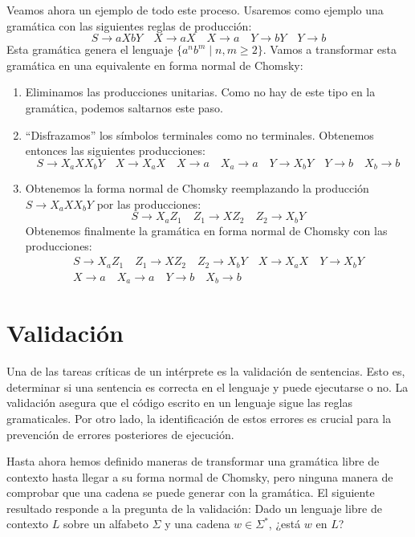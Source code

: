 Veamos ahora un ejemplo de todo este proceso. Usaremos como ejemplo una gramática con las siguientes reglas de
producción:
\begin{equation}
    S\to aXbY\quad X\to aX\quad X\to a\quad Y\to bY\quad Y\to b
\end{equation}
Esta gramática genera el lenguaje $\{a^nb^m\mid n,m\geq 2\}$. Vamos a transformar esta gramática en una equivalente en
forma normal de Chomsky:
\begin{enumerate}
    \item Eliminamos las producciones unitarias. Como no hay de este tipo en la gramática, podemos saltarnos este paso.
    \item ``Disfrazamos'' los símbolos terminales como no terminales. Obtenemos entonces las siguientes producciones:
\begin{equation}
    S\to X_aXX_bY\quad X\to X_aX\quad X\to a\quad X_a\to a\quad Y\to X_bY\quad Y\to b\quad X_b\to b
\end{equation}
    \item Obtenemos la forma normal de Chomsky reemplazando la producción $S\to X_aXX_bY$ por las producciones:
\begin{equation}
    S\to X_aZ_1\quad Z_1\to XZ_2\quad Z_2\to X_bY
\end{equation}
Obtenemos finalmente la gramática en forma normal de Chomsky con las producciones:
\begin{gather}
    S\to X_aZ_1 \quad Z_1\to XZ_2 \quad Z_2\to X_bY \quad X\to X_aX \quad Y\to X_bY \\
    X\to a \quad X_a\to a \quad Y\to b \quad X_b\to b
\end{gather}
\end{enumerate}

\section{Validación}

Una de las tareas críticas de un intérprete es la validación de sentencias. Esto es, determinar si una sentencia
es correcta en el lenguaje y puede ejecutarse o no. La validación asegura que el código escrito en un lenguaje sigue
las reglas gramaticales. Por otro lado, la identificación de estos errores es crucial para la prevención de errores
posteriores de ejecución.

\vspace{10pt}
Hasta ahora hemos definido maneras de transformar una gramática libre de contexto hasta llegar a su forma normal de 
Chomsky, pero ninguna manera de comprobar que una cadena se puede generar con la gramática. El siguiente resultado 
responde a la pregunta de la validación: Dado un lenguaje libre de contexto $L$ sobre un alfabeto $\Sigma$ y una 
cadena $w\in\Sigma^*$, ¿está $w$ en $L$?

